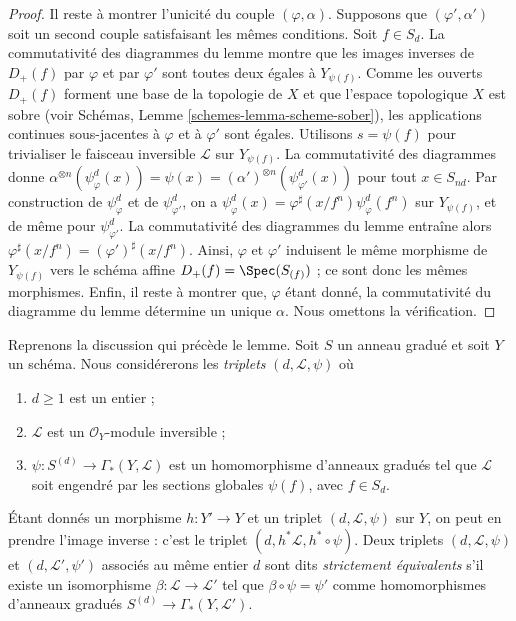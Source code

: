 \begin{proof}
\medskip\noindent
Il reste à montrer l'unicité du couple $(\varphi, \alpha)$. Supposons que
$(\varphi', \alpha')$ soit un second couple satisfaisant les mêmes conditions.
Soit $f \in S_d$. La commutativité des diagrammes du lemme montre que les
images inverses de $D_{+}(f)$ par $\varphi$ et par $\varphi'$ sont toutes deux
égales à $Y_{\psi(f)}$. Comme les ouverts $D_{+}(f)$ forment une base de la
topologie de $X$ et que l'espace topologique $X$ est sobre (voir Schémas,
Lemme \ref{schemes-lemma-scheme-sober}), les applications continues sous-jacentes
à $\varphi$ et à $\varphi'$ sont égales. Utilisons $s = \psi(f)$ pour
trivialiser le faisceau inversible $\mathcal{L}$ sur $Y_{\psi(f)}$.
La commutativité des diagrammes donne
$\alpha^{\otimes n}(\psi^d_{\varphi}(x)) =
\psi(x) = (\alpha')^{\otimes n}(\psi^d_{\varphi'}(x))$
pour tout $x \in S_{nd}$. Par construction de $\psi^d_{\varphi}$ et de
$\psi^d_{\varphi'}$, on a
$\psi^d_{\varphi}(x) = \varphi^\sharp(x/f^n) \psi^d_{\varphi}(f^n)$
sur $Y_{\psi(f)}$, et de même pour $\psi^d_{\varphi'}$.
La commutativité des diagrammes du lemme entraîne alors
$\varphi^\sharp(x/f^n) = (\varphi')^\sharp(x/f^n)$.
Ainsi, $\varphi$ et $\varphi'$ induisent le même morphisme de
$Y_{\psi(f)}$ vers le schéma affine $D_{+}(f) = \Spec(S_{(f)})$ ; ce sont donc
les mêmes morphismes. Enfin, il reste à montrer que, $\varphi$ étant donné, la
commutativité du diagramme du lemme détermine un unique $\alpha$. Nous omettons
la vérification.
\end{proof}

\noindent
Reprenons la discussion qui précède le lemme. Soit $S$ un anneau gradué et
soit $Y$ un schéma. Nous considérerons les {\it triplets}
$(d, \mathcal{L}, \psi)$ où
\begin{enumerate}
\item $d \geq 1$ est un entier ;
\item $\mathcal{L}$ est un $\mathcal{O}_Y$-module inversible ;
\item $\psi : S^{(d)} \to \Gamma_*(Y, \mathcal{L})$ est un homomorphisme
d'anneaux gradués tel que $\mathcal{L}$ soit engendré par les sections
globales $\psi(f)$, avec $f \in S_d$.
\end{enumerate}
Étant donnés un morphisme $h : Y' \to Y$ et un triplet
$(d, \mathcal{L}, \psi)$ sur $Y$, on peut en prendre l'image inverse : c'est
le triplet $(d, h^*\mathcal{L}, h^* \circ \psi)$.
Deux triplets $(d, \mathcal{L}, \psi)$ et
$(d, \mathcal{L}', \psi')$ associés au même entier $d$ sont dits
{\it strictement équivalents} s'il existe un isomorphisme
$\beta : \mathcal{L} \to \mathcal{L}'$ tel que
$\beta \circ \psi = \psi'$ comme homomorphismes d'anneaux gradués
$S^{(d)} \to \Gamma_*(Y, \mathcal{L}')$.

